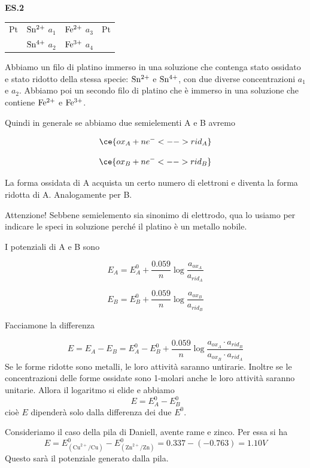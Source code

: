 \vspace{0.2cm}\textbf{ES.2}

\begin{center}
    \begin{tabular}{p{0.6cm}|p{1.6cm}||p{1.6cm}|p{2cm}}
        Pt & $\rm Sn^{2+}$ $a_1$ & $\rm Fe^{2+}$ $a_3$ & Pt\\[0.5ex]
         & $\rm Sn^{4+}$ $a_2$ & $\rm Fe^{3+}$ $a_4$&\\[0.5ex]
    \end{tabular}
\end{center}

Abbiamo un filo di platino immerso in una soluzione che contenga stato ossidato e stato ridotto della stessa specie: $\rm Sn^{2+}$ e $\rm Sn^{4+}$, con due diverse concentrazioni $a_1$ e $a_2$. Abbiamo poi un secondo filo di platino che è immerso in una soluzione che contiene $\rm Fe^{2+}$ e $\rm Fe^{3+}$.

Quindi in generale se abbiamo due semielementi A e B avremo

$$\ce{ox_A + ne^- <--> rid_A}$$

$$\ce{ox_B + ne^- <--> rid_B}$$

La forma ossidata di A acquista un certo numero di elettroni e diventa la forma ridotta di A. Analogamente per B.

Attenzione! Sebbene semielemento sia sinonimo di elettrodo, qua lo usiamo per indicare le speci in soluzione perché il platino è un metallo nobile.

I potenziali di A e B sono

$$E_A = E^0_{A} + \frac{0.059}{n} \log \frac{a_{ox_{A}}}{a_{rid_{A}}}$$

$$E_B = E^0_{B} + \frac{0.059}{n} \log \frac{a_{ox_{B}}}{a_{rid_{B}}}$$

Facciamone la differenza

$$E = E_A - E_B = E^0_{A} - E^0_{B} + \frac{0.059}{n} \log \frac{a_{ox_{A}} \cdot a_{rid_{B}}}{a_{ox_{B}}  \cdot a_{rid_{A}}}$$
Se le forme ridotte sono metalli, le loro attività saranno untirarie. Inoltre se le concentrazioni delle forme ossidate sono 1-molari anche le loro attività saranno unitarie. Allora il logaritmo si elide e abbiamo
$$E=E^0_{A} - E^0_{B}$$
cioè $E$ dipenderà solo dalla differenza dei due $E^0$.

Consideriamo il caso della pila di Daniell, avente rame e zinco. Per essa si ha
$$E=E^0_{(\text{Cu}^{2+}/\text{Cu})} - E^0_{(\text{Zn}^{2+}/\text{Zn})} = 0.337 - (-0.763) = 1.10 V$$
Questo sarà il potenziale generato dalla pila.

